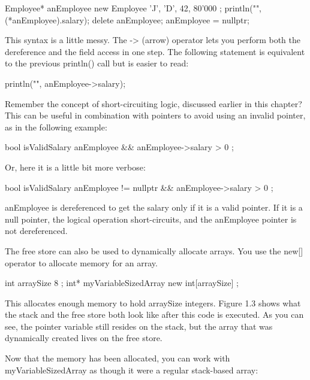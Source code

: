 \begin{cpp}
Employee* anEmployee { new Employee { 'J', 'D', 42, 80'000 } };
println("{}", (*anEmployee).salary);
delete anEmployee; anEmployee = nullptr;
\end{cpp}

This syntax is a little messy. The -> (arrow) operator lets you perform both the dereference and the field access in one step. The following statement is equivalent to the previous println() call but is easier to read:

\begin{cpp}
println("{}", anEmployee->salary);
\end{cpp}

Remember the concept of short-circuiting logic, discussed earlier in this chapter? This can be useful in combination with pointers to avoid using an invalid pointer, as in the following example:

\begin{cpp}
bool isValidSalary { anEmployee && anEmployee->salary > 0 };
\end{cpp}

Or, here it is a little bit more verbose:

\begin{cpp}
bool isValidSalary { anEmployee != nullptr && anEmployee->salary > 0 };
\end{cpp}

anEmployee is dereferenced to get the salary only if it is a valid pointer. If it is a null pointer, the logical operation short-circuits, and the anEmployee pointer is not dereferenced.


The free store can also be used to dynamically allocate arrays. You use the new[] operator to allocate memory for an array.

\begin{cpp}
int arraySize { 8 };
int* myVariableSizedArray { new int[arraySize] };
\end{cpp}

This allocates enough memory to hold arraySize integers. Figure 1.3 shows what the stack and the free store both look like after this code is executed. As you can see, the pointer variable still resides on the stack, but the array that was dynamically created lives on the free store.

Now that the memory has been allocated, you can work with myVariableSizedArray as though it were a regular stack-based array:

